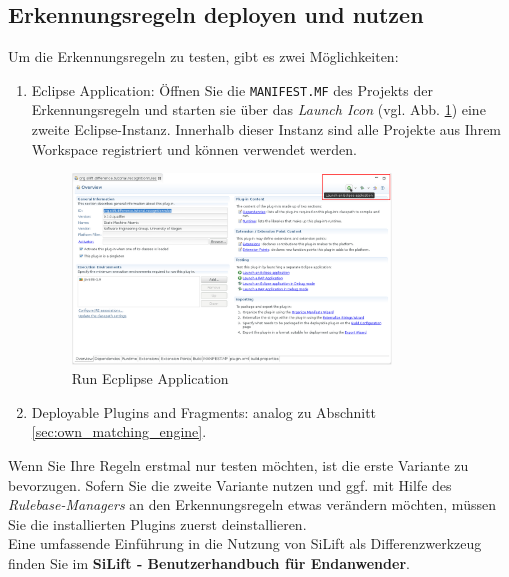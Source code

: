 \subsection{Erkennungsregeln deployen und nutzen}
\label{sec:deploying_recognitionrules}

Um die Erkennungsregeln zu testen, gibt es zwei Möglichkeiten:

\begin{enumerate}

\item Eclipse Application: 
Öffnen Sie die \texttt{MANIFEST.MF} des Projekts der Erkennungsregeln und starten sie über das \textit{Launch Icon} (vgl. Abb. \ref{silift-rulebase_run_eclipse_application}) eine zweite Eclipse-Instanz. Innerhalb dieser Instanz sind alle Projekte aus Ihrem Workspace registriert und können verwendet werden.

\begin{figure}[H]
\centering
\includegraphics[width=0.8\textwidth]{recognitionrules/graphics/silift-rulebase_run_eclipse_application.png}
\caption{Run Ecplipse Application}
\label{silift-rulebase_run_eclipse_application}
\end{figure}


\item Deployable Plugins and Fragments: analog zu Abschnitt \ref{sec:own_matching_engine}.
\end{enumerate}

Wenn Sie Ihre Regeln erstmal nur testen möchten, ist die erste Variante zu bevorzugen. 
Sofern Sie die zweite Variante nutzen und ggf. mit Hilfe des \textit{Rulebase-Managers} an den Erkennungsregeln  etwas verändern möchten, müssen Sie die installierten Plugins zuerst deinstallieren.\\

Eine umfassende Einführung in die Nutzung von SiLift als Differenzwerkzeug finden Sie im \textbf{SiLift - Benutzerhandbuch für Endanwender}.